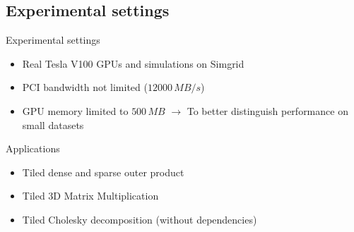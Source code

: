 \documentclass{libs/ufc_format}
\begin{document}
\subsection{Experimental settings}
\begin{frame}{Experimental settings}

        \begin{block}{}
            \begin{itemize}
				\item Real Tesla V100 GPUs and simulations on Simgrid
				\item PCI bandwidth not limited ($12000\,MB/s$)
				\item GPU memory limited to $500\,MB$ $\rightarrow$ To better distinguish performance on small datasets
			\end{itemize}
		\end{block}
			\begin{block}{Applications}
			\begin{itemize}
				\item Tiled dense and sparse outer product 
				\item Tiled 3D Matrix Multiplication
				\item Tiled Cholesky decomposition (without dependencies)
			\end{itemize}
			\end{block}
\end{frame}

\end{document}
